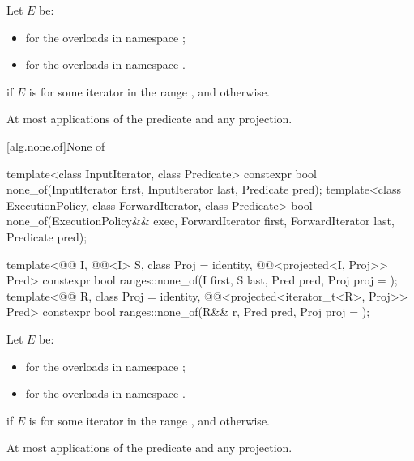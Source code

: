 \begin{itemdescr}
\pnum
Let $E$ be:
\begin{itemize}
\item
   for the overloads in namespace ;
\item
  for the overloads in namespace .
\end{itemize}

\pnum
\returns
{} if $E$ is  for some iterator 
in the range , and  otherwise.

\pnum
\complexity
At most  applications of the predicate
and any projection.
\end{itemdescr}

[alg.none.of]{None of}

%
\begin{itemdecl}
template<class InputIterator, class Predicate>
  constexpr bool none_of(InputIterator first, InputIterator last, Predicate pred);
template<class ExecutionPolicy, class ForwardIterator, class Predicate>
  bool none_of(ExecutionPolicy&& exec, ForwardIterator first, ForwardIterator last,
               Predicate pred);

template<@@ I, @@<I> S, class Proj = identity,
         @@<projected<I, Proj>> Pred>
  constexpr bool ranges::none_of(I first, S last, Pred pred, Proj proj = {});
template<@@ R, class Proj = identity,
         @@<projected<iterator_t<R>, Proj>> Pred>
  constexpr bool ranges::none_of(R&& r, Pred pred, Proj proj = {});
\end{itemdecl}

\begin{itemdescr}
\pnum
Let $E$ be:
\begin{itemize}
\item
   for the overloads in namespace ;
\item
  for the overloads in namespace .
\end{itemize}

\pnum
\returns
{} if $E$ is 
for some iterator  in the range , and
 otherwise.

\pnum
\complexity
At most  applications of the predicate and any projection.
\end{itemdescr}


